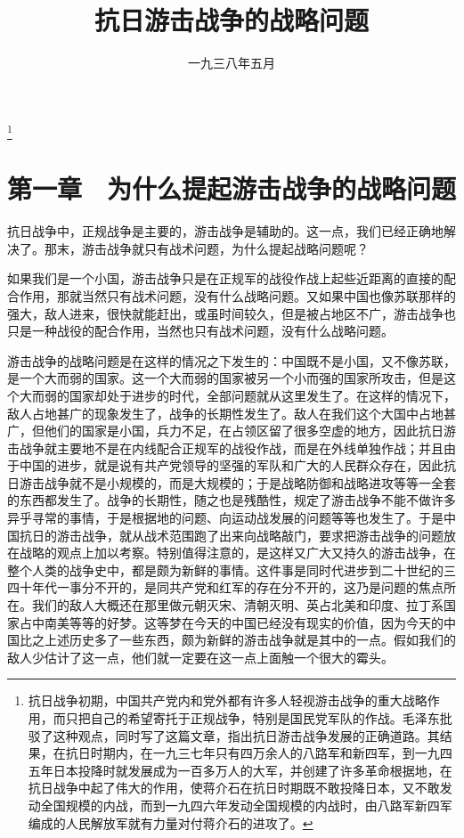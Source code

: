 
\title{抗日游击战争的战略问题}
\date{一九三八年五月}
\thanks{抗日战争初期，中国共产党内和党外都有许多人轻视游击战争的重大战略作用，而只把自己的希望寄托于正规战争，特别是国民党军队的作战。毛泽东批驳了这种观点，同时写了这篇文章，指出抗日游击战争发展的正确道路。其结果，在抗日时期内，在一九三七年只有四万余人的八路军和新四军，到一九四五年日本投降时就发展成为一百多万人的大军，并创建了许多革命根据地，在抗日战争中起了伟大的作用，使蒋介石在抗日时期既不敢投降日本，又不敢发动全国规模的内战，而到一九四六年发动全国规模的内战时，由八路军新四军编成的人民解放军就有力量对付蒋介石的进攻了。}
\maketitle


\section{第一章　为什么提起游击战争的战略问题}

抗日战争中，正规战争是主要的，游击战争是辅助的。这一点，我们已经正确地解决了。那末，游击战争就只有战术问题，为什么提起战略问题呢？

如果我们是一个小国，游击战争只是在正规军的战役作战上起些近距离的直接的配合作用，那就当然只有战术问题，没有什么战略问题。又如果中国也像苏联那样的强大，敌人进来，很快就能赶出，或虽时间较久，但是被占地区不广，游击战争也只是一种战役的配合作用，当然也只有战术问题，没有什么战略问题。

游击战争的战略问题是在这样的情况之下发生的：中国既不是小国，又不像苏联，是一个大而弱的国家。这一个大而弱的国家被另一个小而强的国家所攻击，但是这个大而弱的国家却处于进步的时代，全部问题就从这里发生了。在这样的情况下，敌人占地甚广的现象发生了，战争的长期性发生了。敌人在我们这个大国中占地甚广，但他们的国家是小国，兵力不足，在占领区留了很多空虚的地方，因此抗日游击战争就主要地不是在内线配合正规军的战役作战，而是在外线单独作战；并且由于中国的进步，就是说有共产党领导的坚强的军队和广大的人民群众存在，因此抗日游击战争就不是小规模的，而是大规模的；于是战略防御和战略进攻等等一全套的东西都发生了。战争的长期性，随之也是残酷性，规定了游击战争不能不做许多异乎寻常的事情，于是根据地的问题、向运动战发展的问题等等也发生了。于是中国抗日的游击战争，就从战术范围跑了出来向战略敲门，要求把游击战争的问题放在战略的观点上加以考察。特别值得注意的，是这样又广大又持久的游击战争，在整个人类的战争史中，都是颇为新鲜的事情。这件事是同时代进步到二十世纪的三四十年代一事分不开的，是同共产党和红军的存在分不开的，这乃是问题的焦点所在。我们的敌人大概还在那里做元朝灭宋、清朝灭明、英占北美和印度、拉丁系国家占中南美等等的好梦。这等梦在今天的中国已经没有现实的价值，因为今天的中国比之上述历史多了一些东西，颇为新鲜的游击战争就是其中的一点。假如我们的敌人少估计了这一点，他们就一定要在这一点上面触一个很大的霉头。

